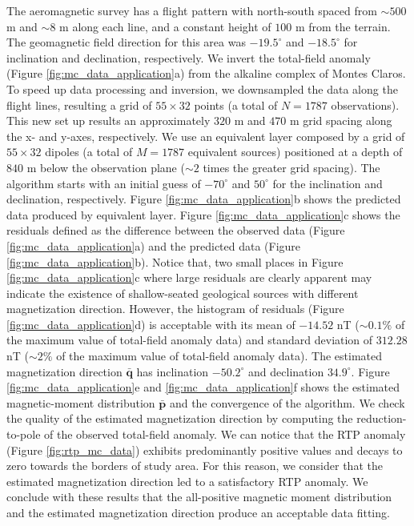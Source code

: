 The aeromagnetic survey has a flight pattern with north-south spaced from $\sim 500$ m and $ \sim 8$ m along each line, and a constant height of $100$ m from the terrain. The geomagnetic field direction for this area was $-19.5^\circ$ and $-18.5^\circ$ for inclination and declination, respectively. We invert the total-field anomaly (Figure \ref{fig:mc_data_application}a) from the alkaline complex of Montes Claros. To speed up data processing and inversion, we downsampled the data along the flight lines, resulting a grid of $55 \times 32$ points (a total of $N=1787$ observations). This new set up results an approximately $320$ m and $470$ m grid spacing along the x- and y-axes, respectively. We use an equivalent layer composed by a grid of $55 \times 32$ dipoles (a total of $M=1787$ equivalent sources) positioned at a depth of $840$ m below the observation plane ($\sim 2$ times the greater grid spacing). The algorithm starts with an initial guess of $-70^\circ$ and $50^\circ$ for the inclination and declination, respectively. Figure \ref{fig:mc_data_application}b shows the predicted data produced by equivalent layer. Figure \ref{fig:mc_data_application}c shows the residuals defined as the difference between the observed data (Figure \ref{fig:mc_data_application}a) and the predicted data (Figure \ref{fig:mc_data_application}b). Notice that, two small places in Figure \ref{fig:mc_data_application}c where large residuals are clearly apparent may indicate the existence of shallow-seated geological sources with different magnetization direction. However, the histogram of residuals (Figure \ref{fig:mc_data_application}d) is acceptable with its mean of $-14.52$ nT ($\sim 0.1\% $ of the maximum value of total-field anomaly data) and standard deviation of $312.28$ nT ($\sim 2 \% $ of the maximum value of total-field anomaly data). The estimated magnetization direction $\bar{\mathbf{q}}$ has inclination $-50.2^\circ$ and declination $34.9^\circ$. Figure \ref{fig:mc_data_application}e and \ref{fig:mc_data_application}f shows the estimated magnetic-moment distribution $\bar{\mathbf{p}}$ and the convergence of the algorithm. We check the quality of the estimated magnetization direction by computing the reduction-to-pole of the observed total-field anomaly. We can notice that the RTP anomaly (Figure \ref{fig:rtp_mc_data}) exhibits predominantly positive values and decays to zero towards the borders of study area. For this reason, we consider that the estimated magnetization direction led to a satisfactory RTP anomaly. We conclude with these results that the all-positive magnetic moment distribution and the estimated magnetization direction produce an acceptable data fitting. 
